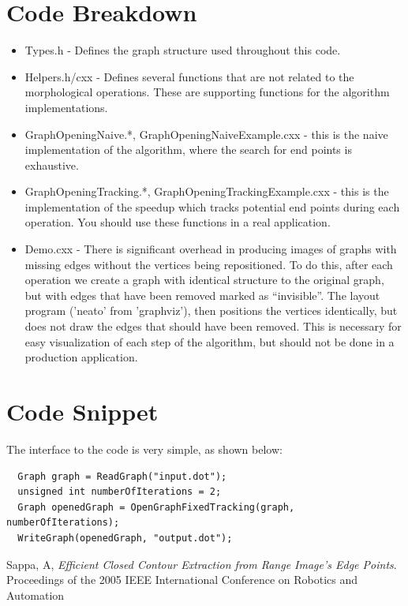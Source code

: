 \documentclass{InsightArticle}
\begin{document}
\section{Code Breakdown}
\begin{itemize}
 \item Types.h - Defines the graph structure used throughout this code.
 \item Helpers.h/cxx - Defines several functions that are not related to the morphological operations. These are supporting functions for the algorithm implementations.
 \item GraphOpeningNaive.*, GraphOpeningNaiveExample.cxx - this is the naive implementation of the algorithm, where the search for end points is exhaustive.
 \item GraphOpeningTracking.*, GraphOpeningTrackingExample.cxx - this is the implementation of the speedup which tracks potential end points during each operation. You should use these functions in a real application.
 \item Demo.cxx - There is significant overhead in producing images of graphs with missing edges without the vertices being repositioned. To do this, after each operation we create a graph with identical structure to the original graph, but with edges that have been removed marked as ``invisible''. The layout program ('neato' from 'graphviz'), then positions the vertices identically, but does not draw the edges that should have been removed. This is necessary for easy visualization of each step of the algorithm, but should not be done in a production application.
\end{itemize}

\section{Code Snippet}
The interface to the code is very simple, as shown below:
\begin{verbatim}
  Graph graph = ReadGraph("input.dot");
  unsigned int numberOfIterations = 2;
  Graph openedGraph = OpenGraphFixedTracking(graph, numberOfIterations);
  WriteGraph(openedGraph, "output.dot");
\end{verbatim}


\begin{thebibliography}{9}

	  Sappa, A,
	  \emph{Efficient Closed Contour Extraction from Range Image's Edge Points}.
	  Proceedings of the 2005 IEEE International Conference on Robotics and Automation

\end{thebibliography}
\end{document}
